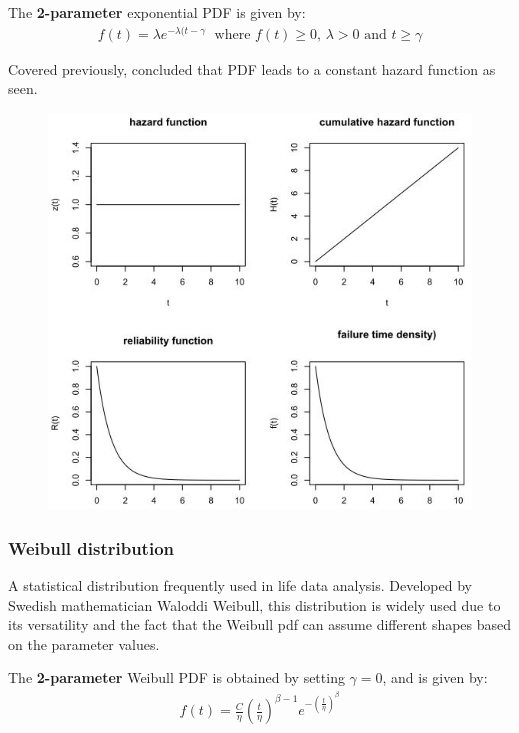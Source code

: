 \documentclass[10pt,a4paper]{article}
\begin{document}
The \textbf{2-parameter} exponential PDF is given by: 
\begin{align*}
    f(t) = \lambda e^{-\lambda(t-\gamma} \; \text{ where } f(t)\geq 0 \text{, } \lambda>0 \text{ and } t\geq \gamma
\end{align*}

Covered previously, concluded that PDF leads to a constant hazard function as seen.
\begin{figure} [h!]
    \centering
    \includegraphics[scale=0.7]{exphazard.JPG}
\end{figure}

\pagebreak

\subsubsection{Weibull distribution}

A statistical distribution frequently used in life data analysis. Developed by Swedish mathematician
Waloddi Weibull, this distribution is widely used due to its versatility and the fact that the
Weibull pdf can assume different shapes based on the parameter values.

The \textbf{2-parameter} Weibull PDF is obtained by setting $\gamma=0$, and is given by: 
\begin{align*}
    f(t) = \frac{C}{\eta}\left(\frac{t}{\eta}\right)^{\beta - 1}e^{{-\left(\frac{t}{\eta}\right)}^{\beta}}
\end{align*}
\end{document}
